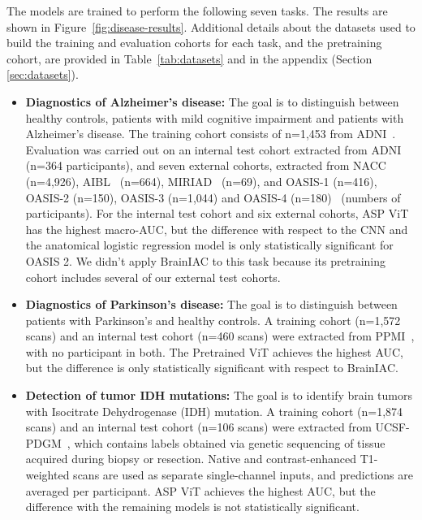 \documentclass[pdflatex,sn-nature]{sn-jnl}%
\newif\ifhighlight
\newcommand{\rev}[1]{\ifhighlight{\color{blue}{}#1}\else#1\fi}%
\newcommand{\revdel}[1]{\ifhighlight{\color{red}\sout{#1}}\fi}
\theoremstyle{thmstyleone}%
\theoremstyle{thmstyletwo}%
\theoremstyle{thmstylethree}%
\begin{document}
The models are trained to perform the following seven tasks. The results are shown in Figure~\ref{fig:disease-results}. Additional details about the datasets used to build the training and evaluation cohorts for each task, and the pretraining cohort, are provided in Table~\ref{tab:datasets} and in the appendix (Section \ref{sec:datasets}). 

\begin{itemize}
\item \textbf{Diagnostics of Alzheimer's disease:} The goal is to distinguish between healthy controls, patients with mild cognitive impairment and patients with Alzheimer's disease.
The training cohort consists of n=1,453 \revdel{subjects} from ADNI~\citep{petersen2010alzheimer}. Evaluation was carried out on an internal test cohort extracted from ADNI (n=364\rev{ participants}), and seven external cohorts, extracted from NACC~\citep{beekly2007national} (n=4,926), AIBL~\citep{ellis2006australian} (n=664), MIRIAD~\citep{malone2013miriad} (n=69), and OASIS-1 (n=416), OASIS-2 (n=150), OASIS-3 (n=1,044) and OASIS-4 (n=180)~\citep{lamontagne2019oasis,marcus2010open, marcus2007open}\rev{ (numbers of participants)}.
For the internal test cohort and six external cohorts, ASP ViT has the highest macro-AUC, but the difference with respect to the CNN and the anatomical logistic regression model is only statistically significant for OASIS 2. We didn't apply BrainIAC to this task because its pretraining cohort includes several of our external test cohorts.
\item \textbf{Diagnostics of Parkinson's disease:} The goal is to distinguish between patients with Parkinson's and healthy controls. A training cohort (n=1,572\rev{ scans}) and an internal test cohort (n=460\rev{ scans}) were extracted from PPMI~\citep{marek2011parkinson}\rev{, with no participant in both}. The Pretrained ViT achieves the highest AUC, but the difference is only statistically significant with respect to BrainIAC. 
\item \textbf{Detection of tumor IDH mutations:} The goal is to identify brain tumors with Isocitrate Dehydrogenase (IDH) mutation. A training cohort (n=1,874\rev{ scans}) and an internal test cohort (n=106\rev{ scans}) were extracted from UCSF-PDGM~\citep{calabrese2022university}, which contains labels obtained via genetic sequencing of tissue acquired during biopsy or resection. \rev{Native and contrast-enhanced T1-weighted scans are used as separate single-channel inputs, and predictions are averaged per participant.} ASP ViT achieves the highest AUC, but the difference with the remaining models is not statistically significant. 

\end{itemize}
\end{document}

